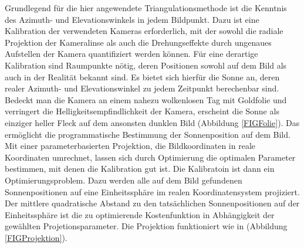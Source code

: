 \documentclass[a4paper,11pt,twoside,german]{article}
\newcommand{\absatz}{\smallbreak} %
\begin{document}
Grundlegend für die hier angewendete Triangulationsmethode ist die Kenntnis des
Azimuth- und Elevationswinkels in jedem Bildpunkt. Dazu ist eine Kalibration der
verwendeten Kameras erforderlich, mit der sowohl die radiale Projektion der
Kameralinse als auch die Drehungseffekte durch ungenaues Aufstellen der Kamera
quantifiziert werden können. Für eine derartige Kalibration sind Raumpunkte
nötig, deren Positionen sowohl auf dem Bild als auch in der Realität bekannt
sind. Es bietet sich hierfür die Sonne an, deren realer Azimuth- und
Elevationswinkel zu jedem Zeitpunkt berechenbar sind.
\absatz
Bedeckt man die Kamera an einem nahezu wolkenlosen Tag mit Goldfolie und
verringert die Helligkeitsempfindlichkeit der Kamera, erscheint die Sonne als
einziger heller Fleck auf dem ansonsten dunklen Bild (Abbildung \ref{FIGFolie}).
Das ermöglicht die programmatische Bestimmung der Sonnenposition auf dem Bild.
\absatz
Mit einer parameterbasierten Projektion, die Bildkoordinaten in reale
Koordinaten umrechnet, lassen sich durch Optimierung die optimalen Parameter
bestimmen, mit denen die Kalibration gut ist.
Die Kalibratoin ist dann ein Optimierungsproblem.
Dazu werden alle auf dem Bild gefundenen Sonnenpositionen auf eine
Einheitssphäre im realen Koordinatensystem projiziert. Der mittlere
quadratische Abstand zu den tatsächlichen Sonnenpositionen auf der
Einheitssphäre ist die zu optimierende Kostenfunktion in Abhängigkeit der
gewählten Projetionsparameter.
\absatz
Die Projektion funktioniert wie in (Abbildung \ref{FIGProjektion}).
\end{document}
